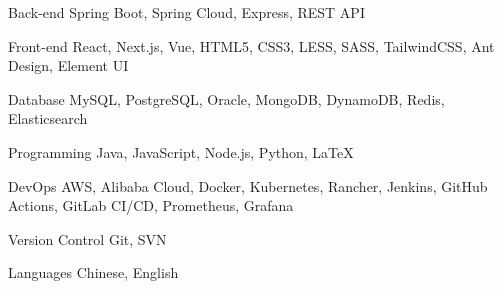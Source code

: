 

\begin{cvskills}

  \cvskill
  {Back-end} %
  {Spring Boot, Spring Cloud, Express, REST API} %

  \cvskill
  {Front-end} %
  {React, Next.js, Vue, HTML5, CSS3, LESS, SASS, TailwindCSS, Ant Design, Element UI} %

  \cvskill
  {Database} %
  {MySQL, PostgreSQL, Oracle, MongoDB, DynamoDB, Redis, Elasticsearch} %

  \cvskill
  {Programming} %
  {Java, JavaScript, Node.js, Python, LaTeX} %

  \cvskill
  {DevOps} %
  {AWS, Alibaba Cloud, Docker, Kubernetes, Rancher, Jenkins, GitHub Actions, GitLab CI/CD, Prometheus, Grafana} %

  \cvskill
  {Version Control} %
  {Git, SVN} %

  \cvskill
  {Languages} %
  {Chinese, English} %

\end{cvskills}
